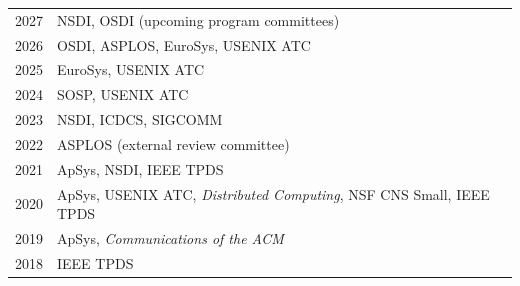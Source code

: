 \documentclass[10pt,letterpaper]{article}
\newcommand{\cvsection}[1]{\Needspace{4\baselineskip}\vspace{8pt}{\large\bfseries #1}\par\vspace{3pt}}
\begin{document}
\cvsection{Committee, Panel, and Referee Service}
\begin{tabularx}{\linewidth}{@{}p{0.6in}X@{}}
2027 & NSDI, OSDI (upcoming program committees)\\[3pt]
2026 & OSDI, ASPLOS, EuroSys, USENIX ATC\\[3pt]
2025 & EuroSys, USENIX ATC\\[3pt]
2024 & SOSP, USENIX ATC\\[3pt]
2023 & NSDI, ICDCS, SIGCOMM\\[3pt]
2022 & ASPLOS (external review committee)\\[3pt]
2021 & ApSys, NSDI, IEEE TPDS\\[3pt]
2020 & ApSys, USENIX ATC, \emph{Distributed Computing}, NSF CNS Small, IEEE TPDS\\[3pt]
2019 & ApSys, \emph{Communications of the ACM}\\[3pt]
2018 & IEEE TPDS
\end{tabularx}
\end{document}

